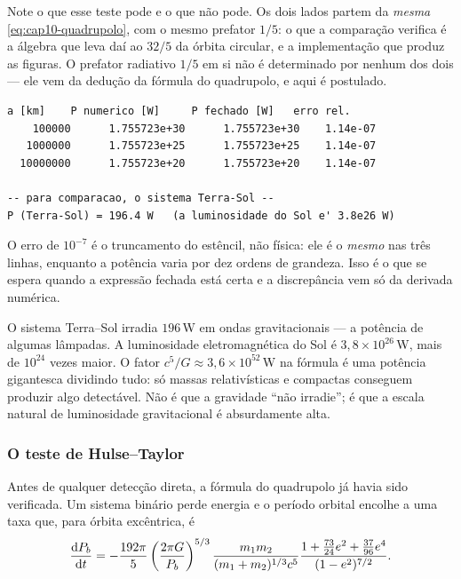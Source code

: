 Note o que esse teste pode e o que não pode. Os dois lados partem da
\emph{mesma} \eqref{eq:cap10-quadrupolo}, com o mesmo prefator $1/5$: o que a
comparação verifica é a álgebra que leva daí ao $32/5$ da órbita circular, e a
implementação que produz as figuras. O prefator radiativo $1/5$ em si não é
determinado por nenhum dos dois --- ele vem da dedução da fórmula do
quadrupolo, e aqui é postulado.

\begin{saida}
\begin{lstlisting}[style=rgsaida]
    a [km]    P numerico [W]     P fechado [W]   erro rel.
    100000      1.755723e+30      1.755723e+30    1.14e-07
   1000000      1.755723e+25      1.755723e+25    1.14e-07
  10000000      1.755723e+20      1.755723e+20    1.14e-07

-- para comparacao, o sistema Terra-Sol --
P (Terra-Sol) = 196.4 W   (a luminosidade do Sol e' 3.8e26 W)
\end{lstlisting}
\end{saida}

O erro de $10^{-7}$ é o truncamento do estêncil, não física: ele é o
\emph{mesmo} nas três linhas, enquanto a potência varia por dez ordens de
grandeza. Isso é o que se espera quando a expressão fechada está certa e a
discrepância vem só da derivada numérica.

\begin{central}
O sistema Terra--Sol irradia $196\,$W em ondas gravitacionais --- a potência
de algumas lâmpadas. A luminosidade eletromagnética do Sol é
$3{,}8\times10^{26}\,$W, mais de $10^{24}$ vezes maior. O fator $c^{5}/G
\approx 3{,}6\times10^{52}\,$W na fórmula é uma potência gigantesca dividindo
tudo: só massas relativísticas e compactas conseguem produzir algo
detectável. Não é que a gravidade ``não irradie''; é que a escala natural de
luminosidade gravitacional é absurdamente alta.
\end{central}

\subsubsection*{O teste de Hulse--Taylor}

Antes de qualquer detecção direta, a fórmula do quadrupolo já havia sido
verificada. Um sistema binário perde energia e o período orbital encolhe a
uma taxa que, para órbita excêntrica, é
\begin{equation}
  \frac{\mathrm{d} P_{b}}{\mathrm{d} t} = -\frac{192\pi}{5}
    \left(\frac{2\pi G}{P_{b}}\right)^{5/3}
    \frac{m_{1}m_{2}}{(m_{1}+m_{2})^{1/3}c^{5}}
    \frac{1 + \tfrac{73}{24}e^{2} + \tfrac{37}{96}e^{4}}{(1-e^{2})^{7/2}}.
  \label{eq:cap10-peters}
\end{equation}

